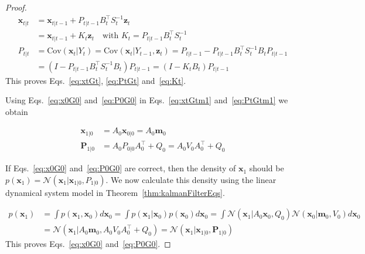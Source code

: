 \documentclass[12pt]{article}
\begin{document}
\begin{proof}
    \begin{align}
        \mathbf{x}_{t|t}&=\mathbf{x}_{t|t-1}+P_{t|t-1}B_t^\intercal
        S_t^{-1}\mathbf{z}_t\nonumber\\
                        &=\mathbf{x}_{t|t-1}+K_t\mathbf{z}_t\quad\text{with } K_t=P_{t|t-1}B_t^\intercal S_t^{-1}\nonumber\\
        P_{t|t}&=\text{Cov}(\mathbf{x}_t|Y_t)=\text{Cov}(\mathbf{x}_t|Y_{t-1},\mathbf{z}_t)=P_{t|t-1}-P_{t|t-1}B_t^\intercal S_t^{-1}B_tP_{t|t-1}\nonumber\\
               &=\left(I-P_{t|t-1}B_t^\intercal S_t^{-1}B_t\right)P_{t|t-1}=\left(I-K_tB_t\right)P_{t|t-1}\label{eq:PtGtProof}
    \end{align}
	This proves Eqs.~\ref{eq:xtGt}, \ref{eq:PtGt} and~\ref{eq:Kt}.

	Using Eqs.~\ref{eq:x0G0} and~\ref{eq:P0G0} in Eqs.~\ref{eq:xtGtm1} and~\ref{eq:PtGtm1} we obtain

    \begin{align*}
        \mathbf{x}_{1|0}&=A_0\mathbf{x}_{0|0}=A_0\mathbf{m}_0\\
        \mathbf{P}_{1|0}&=A_0P_{0|0}A_0^\intercal+Q_0=A_0V_0A_0^\intercal+Q_0
    \end{align*}

	If Eqs.~\ref{eq:x0G0} and~\ref{eq:P0G0} are correct, then the density of $\mathbf{x}_1$ should be $p(\mathbf{x}_1)=\mathcal{N}(\mathbf{x}_1|\mathbf{x}_{1|0},P_{1|0})$. We now calculate this density using the linear dynamical system model in Theorem~\ref{thm:kalmanFilterEqs}.

    \begin{align}
		p(\mathbf{x}_1)&=\int p(\mathbf{x}_1,\mathbf{x}_0)d\mathbf{x}_0=\int p(\mathbf{x}_1|\mathbf{x}_0)p(\mathbf{x}_0)d\mathbf{x}_0=\int\mathcal{N}(\mathbf{x}_1|A_0\mathbf{x}_0,Q_0)\mathcal{N}(\mathbf{x}_0|\mathbf{m}_0,V_0)d\mathbf{x}_0\nonumber\\
		               &=\mathcal{N}(\mathbf{x}_1|A_0\mathbf{m}_0,A_0V_0A_0^\intercal+Q_0)=\mathcal{N}(\mathbf{x}_1|\mathbf{x}_{1|0},\mathbf{P}_{1|0})\label{eq:px1}
    \end{align}
	This proves Eqs.~\ref{eq:x0G0} and~\ref{eq:P0G0}.

\end{proof}
\end{document}
